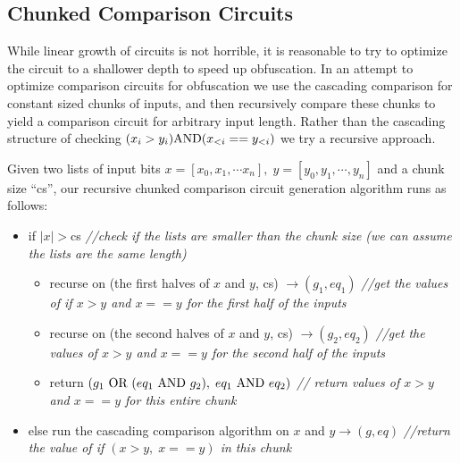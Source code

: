 \documentclass[12pt,twoside]{reedthesis}
\begin{document}
 \subsection{Chunked Comparison Circuits}
 \par While linear growth of circuits is not horrible, it is reasonable to try to optimize the circuit to a shallower depth to speed up obfuscation. In an attempt to optimize comparison circuits for obfuscation we use the cascading comparison for constant sized chunks of inputs, and then recursively compare these chunks to yield a comparison circuit for arbitrary input length. Rather than the cascading structure of checking $(x_i> y_i) \text{AND} (x_{<i} == y_{<i})$ we try a recursive approach. 
 \par Given two lists of input bits $ x =[x_0,x_1, \cdots x_n], \; y= [y_0,y_1,\cdots , y_n]$ and a chunk size ``cs'',
our recursive chunked comparison circuit generation algorithm runs as follows:
  \begin{itemize}
 \item if $|x|>$cs \textit{ //check if the lists are smaller than the chunk size (we can assume the lists are the same length)}
 	\begin{itemize}
	\item recurse on (the first halves of $x$ and $y$, cs) $\to (g_1,eq_1)$ \textit{//get the values of if $x>y$ and $x==y$ for the first half of the inputs}
	\item recurse on (the second halves of $x$ and $y$, cs) $\to (g_2, eq_2)$ \textit{//get the values of $x>y$ and $x==y$ for the second half of the inputs}
	\item return $(g_1\ \text{OR}\ (eq_1\ \text{AND}\ g_2), \; eq_1\ \text{AND} \ eq_2)$ \textit{// return values of $x>y$ and $x==y$ for this entire chunk}
	\end{itemize} 
\item else run the cascading comparison algorithm on $x$ and $y \to (g,eq)$ \textit{ //return the value of if $(x>y, \; x==y)$ in this chunk}
 \end{itemize}
 
\end{document}
